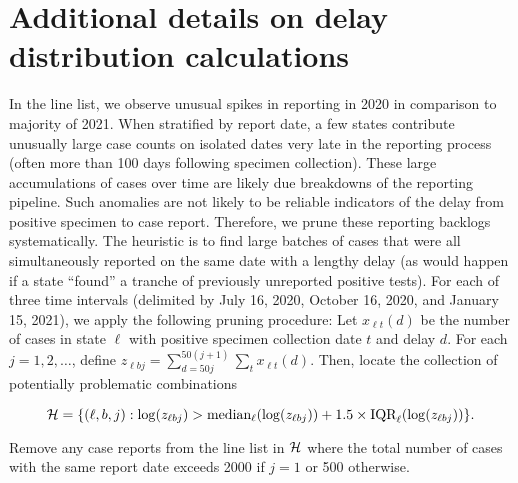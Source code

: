 \section{Additional details on delay distribution calculations}
\label{sec:delay-justifications}
\begin{linenomath*}
In the line list, we observe unusual spikes in reporting in 2020 in comparison
to majority of 2021. When stratified by report date, a few states contribute
unusually large case counts on isolated dates very late in the reporting process
(often more than 100 days following specimen collection). These large
accumulations of cases over time are likely due breakdowns of the reporting
pipeline. Such anomalies are not likely to be reliable indicators of the delay
from positive specimen to case report. Therefore, we prune these reporting
backlogs systematically. The heuristic is to find large batches of cases that
were all simultaneously reported on the same date with a lengthy delay (as would
happen if a state ``found'' a tranche of previously unreported positive tests).
For each of three time intervals (delimited by July 16, 2020, 
October 16, 2020, and January 15, 2021), we apply the following pruning procedure:
Let $x_{\ell t}(d)$ be the number of cases in state $\ell$ with positive
specimen collection date $t$ and delay $d$. For each $j=1,2,\ldots$, 
define 
$
z_{\ell bj} = \sum_{d = 50j}^{50(j+1)}\sum_t x_{\ell
t}(d).$ Then, locate the collection of
potentially problematic combinations 
\end{linenomath*}
\begin{linenomath*}
$$
\mathcal{H} = \{(\ell, b, j) : \log(z_{\ell bj}) >
\textrm{median}_{\ell}(\log(z_{\ell bj})) + 1.5
\times\textrm{IQR}_\ell(\log(z_{\ell bj}))\}.
$$
\end{linenomath*}
Remove any case reports from the line list in $\mathcal{H}$ where the total number of
cases with the same report date exceeds 2000 if $j=1$ or 500 otherwise.


